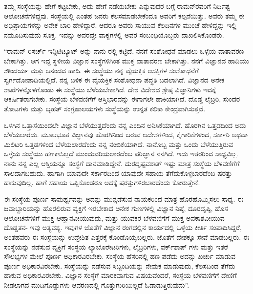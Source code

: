 ತಮ್ಮ ಸಂಸ್ಥೆಯನ್ನು ಹೇಗೆ ಕಟ್ಟಬೇಕು, ಅದು ಹೇಗೆ ನಡೆಯಬೇಕು ಎನ್ನುವುದರ ಬಗ್ಗೆ ರಾಮನ್‍ರವರಿಗೆ ನಿರ್ದಿಷ್ಟ ಆಲೋಚನೆಗಳಿದ್ದವು. ಸಂಸ್ಥೆಯಲ್ಲಿ ಎಂತಹ ಜನರು ಕೆಲಸಮಾಡಬೇಕೆಂದೂ ಅವರಿಗೆ ಕಲ್ಪನೆಯಿತ್ತು. ಅವರು ತಮ್ಮ ಈ ಅಭಿಪ್ರಾಯಗಳನ್ನು ಅನೇಕ ಬಾರಿ ಹೇಳಿದ್ದಾರೆ. ಆದರೂ ಅವರು ಸಾಯುವ ಕೆಲದಿನಗಳ ಮುಂಚೆ ಹೇಳಿದ್ದನ್ನು ಇಲ್ಲಿ ನಮೂದಿಸುವುದು ಸೂಕ್ತ. ಇದನ್ನು ಅವರದ್ದೇ ವಾಕ್ಯಗಳಲ್ಲಿ ಅವರ ಸಂಬಂಧಿಯೊಬ್ಬರು ದಾಖಲಿಸಿಕೊಂಡರು.

“ರಾಮನ್ ರಿಸರ್ಚ್ ಇನ್ಸಿಟಿಟ್ಯೂಟ್ ಅನ್ನು ನಾನು ರಲ್ಲಿ ಕಟ್ಟಿದೆ. ನನಗೆ ಸಂಶೋಧನೆ ಮಾಡಲು ಒಳ್ಳೆಯ ವಾತಾವರಣ ಬೇಕಾಗಿತ್ತು. ಆಗ ಇದ್ದ ಸ್ಥಳೀಯ ವಿಜ್ಞಾನ ಸಂಸ್ಥೆಗಳಿಗಿಂತ ಮುಕ್ತ ವಾತಾವರಣ ಬೇಕಾಗಿತ್ತು. ನನಗೆ ವಿಜ್ಞಾನದ ಹಾದಿಯು ಸೌಂದರ್ಯ ಮತ್ತು ಆನಂದದ ಹಾದಿ. ಈ ಸಂಸ್ಥೆಯು ನನ್ನ ವೈಯಕ್ತಿಕ ಆಸಕ್ತಿಗಳ ಸಂಶೋಧನೆಗೆ ಸ್ವರ್ಗದೋಪಾದಿಯಲ್ಲಿದೆ. ನನ್ನ ಬಳಿಕ ಈ ವೈಯಕ್ತಿಕ ಸಂಶೋಧನಾ ಪದ್ಧತಿ ಬದಲಾಗಿದೆ. ವಿಜ್ಞಾನದ ಅನೇಕ ಶಾಖೆಗಳನ್ನೊಳಗೊಂಡು ಈ ಸಂಸ್ಥೆಯು ಬೆಳೆಯಬೇಕಾಗಿದೆ. ದೇಶ ವಿದೇಶದ ಶ್ರೇಷ್ಠ ವಿಜ್ಞಾನಿಗಳು ಇದಕ್ಕೆ ಆಕರ್ಷಿತರಾಗಬೇಕು. ಸಂಸ್ಥೆಯ ಬೆಳವಣಿಗೆಗೆ ಆಸ್ತಿಭಾರವನ್ನು ಈಗಾಗಲೇ ಹಾಕಿಯಾಗಿದೆ. ದೊಡ್ಡ ಲೈಬ್ರರಿ, ಸುಂದರ ತೋಟಗಳು ಮತ್ತು ಬೃಹತ್ ಸಂಗ್ರಹಾಲಯಗಳು ಸಂಸ್ಥೆಯನ್ನು ಉನ್ನತ ಕಲಿಕಾ ಕೇಂದ್ರವಾಗಿಸುತ್ತವೆ.

ಒಳಗಿನ ಒತ್ತಾಸೆಯಿಂದಲೇ ವಿಜ್ಞಾನ ಬೆಳೆಯುತ್ತದೆಂದು ನನ್ನ ಎಂದಿನ ಅನಿಸಿಕೆಯಾಗಿದೆ. ಹೊರಗಿನ ಒತ್ತಡದಿಂದ ಅದು ಬೆಳೆಯಲಾರದು. ಮೂಲಭೂತ ವಿಜ್ಞಾನವು ಹೊರಗಿನಿಂದ ಬರುವ ಆದೇಶಗಳಿಂದ, ಕೈಗಾರಿಕೆಗಳಿಂದ, ಸರ್ಕಾರಿ ಅಥವಾ ಮಿಲಿಟರಿ ಒತ್ತಡಗಳಿಂದ ಬೆಳೆಯಲಾರದೆಂದು ನನ್ನ ನಂಬಿಕೆಯಾಗಿದೆ. ನಾನೊಬ್ಬ  ಮತ್ತು ಒಂದು ಬೆಳೆಯುತ್ತಿರುವ ಒಳ್ಳೆಯ ಸಂಸ್ಥೆಯು ಹಣಕಾಸಿಲ್ಲದೆ ಮುಂದುವರಿಯಲಾರದೆಂಬ ಪರಿಜ್ಞಾನ ನನಗಿದೆ. ಇದು ಇತರರಿಂದ ಸಾಧ್ಯವಿಲ್ಲ. ನಾನು ನನ್ನ ಎಲ್ಲ ಆಸ್ತಿಯನ್ನೂ ಸಂಸ್ಥೆಗೆ ದಾನಮಾಡಿದ್ದೇನೆ. ದುರದೃಷ್ಟವಶಾತ್ ಇಷ್ಟು ಮಾತ್ರ ಸಂಸ್ಥೆಯ ಬೆಳವಣಿಗೆಗೆ ಸಾಲದಾಗಬಹುದು. ಹಾಗಾಗಿ ಯಾವುದೇ ಸರ್ಕಾರದಿಂದ ಯಾವುದೇ ಸಹಾಯ ತೆಗೆದುಕೊಳ್ಳಬಾರದೆಂಬ ಷರತ್ತು ಹಾಕುವುದಿಲ್ಲ. ಹಾಗೆ ಸಹಾಯ ಒಪ್ಪಿಕೊಂಡರೂ ಅದಕ್ಕೆ ಷರತ್ತುಗಳಿರಬಾರದೆಂದು ಕೋರುತ್ತೇನೆ.

ಈ ಸಂಸ್ಥೆಯ ಪೂರ್ಣ ಸಾಮರ್ಥ್ಯವನ್ನು ಅದನ್ನು ಮುನ್ನಡೆಸುವ ನಾಯಕರಿಂದ ಮಾತ್ರ ಹೊರಹೊಮ್ಮಿಸಲು ಸಾಧ್ಯ. ಈ ಜವಾಬ್ದಾರಿಯನ್ನು ಹೊರಲಿರುವ ವ್ಯಕ್ತಿಗೆ ಇರಬೇಕಾದ ಅನೇಕ ಗುಣಗಳಲ್ಲಿ ವಿಜ್ಞಾನ ನಿಷ್ಠೆ, ದೂರದೃಷ್ಠಿ, ಹೊಸ ಆಲೋಚನೆಗಳಿಗೆ ಮುಕ್ತ ಆಹ್ವಾನವೀಯುವುದು, ಮತ್ತು ಯುವಕರ ಬೆಳವಣಿಗೆಗೆ ಮುಕ್ತ ಅವಕಾಶವೀಯುವ ದೊಡ್ಡತನ- ಇವು ಅತ್ಯವಶ್ಯ. ಇವುಗಳ ಜೊತೆಗೆ ವಿಜ್ಞಾನ ರಂಗದಲ್ಲಿನ ಕಾರ್ಯದಲ್ಲಿ ಒಳ್ಳೆಯ ಕೀರ್ತಿ ಸಂಪಾದಿಸಿದ್ದರೆ, ಅಂತಹವರು ಈ ಸಂಸ್ಥೆಯನ್ನು ಉದ್ದೇಶಿತ ಎತ್ತರಕ್ಕೆ ಕೊಂಡೊಯ್ಯಬಲ್ಲರು. ಜೊತೆಗೆ ದೇಶಕ್ಕೂ ಸೇವೆ ಮಾಡಬಲ್ಲರು. ಈ ಸಂಸ್ಥೆಯನ್ನು ನಡೆಸುವ ವ್ಯಕ್ತಿಗೆ ಸಂಸ್ಥೆಯ ಲ್ಯಾಬೊರೇಟರಿಗಳು, ಲೈಬ್ರರಿಗಳು, ವರ್ಕ್‌ಶಾಪ್ ಗಳು ಮತ್ತು ಇತರೆ ಸೌಲಭ್ಯಗಳ ಮೇಲೆ ಪೂರ್ಣ ಅಧಿಕಾರವಿರಬೇಕು. ಸಂಸ್ಥೆಯ ಹೆಸರಿನಲ್ಲಿ ಹಣ ಪಡೆದು ಅದನ್ನು ಖರ್ಚು ಮಾಡುವ ಪೂರ್ಣ ಅಧಿಕಾರವಿರಬೇಕು. ಸಂಸ್ಥೆಯನ್ನು ನಡೆಸುವ ಸಿಬ್ಬಂದಿಯನ್ನು ನೇಮಕ ಮಾಡುವುದು, ಕೆಲಸದಿಂದ ತೆಗೆದು ಹಾಕುವ ಅಧಿಕಾರವಿರಬೇಕು. ವಿಜ್ಞಾನ ಸಂಸ್ಥೆಗೆ ಮಾರಕವಾಗುವ ವಿಷಯವೆಂದರೆ, ಸಂಸ್ಥೆಯ ಬೆಳವಣಿಗೆಗೆ ದೇಣಿಗೆ ನೀಡಲಾಗದ ಮುದಿಗೊಡ್ಡುಗಳು ಆವರಣದಲ್ಲಿ ಗೊತ್ತುಗುರಿಯಿಲ್ಲದೆ ಓಡಾಡುತ್ತಿರುವುದು”.

